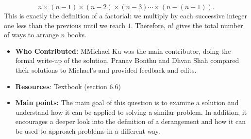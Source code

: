 \documentclass{article}
\begin{document}
\[
n \times (n-1) \times (n-2) \times (n-3)\cdots \times (n-(n-1)).
\]  
This is exactly the definition of a factorial: we multiply by each successive integer one less than the previous until we reach $1$. Therefore, $n!$ gives the total number of ways to arrange $n$ books.  \\
\begin{itemize}
\item \textbf{Who Contributed:} MMichael Ku was the main contributor, doing the formal write-up of the solution. Pranav Bonthu and Dhvan Shah compared their solutions to Michael's and provided feedback and edits.
\item \textbf{Resources}: Textbook (section 6.6)
\item \textbf{Main points:} The main goal of this question is to examine a solution and understand how it can be applied to solving a similar problem. In addition, it encourages a deeper look into the definition of a derangement and how it can be used to approach problems in a different way.
\end{itemize}
\end{document}
